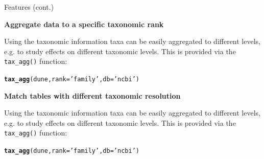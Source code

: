 \documentclass[final,t]{beamer}\usepackage[]{graphicx}\usepackage[]{color}
\makeatletter
\newcommand{\hlstr}[1]{\textcolor[rgb]{0.192,0.494,0.8}{#1}}%
\newcommand{\hlstd}[1]{\textcolor[rgb]{0.345,0.345,0.345}{#1}}%
\newcommand{\hlkwc}[1]{\textcolor[rgb]{0.333,0.667,0.333}{#1}}%
\newcommand{\hlkwd}[1]{\textcolor[rgb]{0.737,0.353,0.396}{\textbf{#1}}}%
\newenvironment{kframe}{%
 \def\at@end@of@kframe{}%
 \ifinner\ifhmode%
  \def\at@end@of@kframe{\end{minipage}}%
  \begin{minipage}{\columnwidth}%
 \fi\fi%
 \def\FrameCommand##1{\hskip\@totalleftmargin \hskip-\fboxsep
 \colorbox{shadecolor}{##1}\hskip-\fboxsep
     \hskip-\linewidth \hskip-\@totalleftmargin \hskip\columnwidth}%
 \MakeFramed {\advance\hsize-\width
   \@totalleftmargin\z@ \linewidth\hsize
   \@setminipage}}%
 {\par\unskip\endMakeFramed%
 \at@end@of@kframe}
\newenvironment{knitrout}{}{} %
\renewenvironment{knitrout}{}{\vspace{-1.8em}}
\makeatother
\begin{document}
\begin{frame}[fragile]
\begin{columns}[t]
\begin{column}{.49\linewidth}
\begin{block}{Features (cont.)}
\begin{knitrout}
\end{knitrout}
\vspace{2em}

\textcolor{i6bluedark}{\textbf{\large Aggregate data to a specific taxonomic rank}}
        \vspace{0.5em}
        \par
        \begingroup
        \leftskip=2cm
        \noindent 
          Using the taxonomic information taxa can be easily aggregated to different levels, e.g. to study effects on different taxonomic levels.
          This is provided via the \texttt{tax\_agg()} function:
        \par
        \endgroup

\begin{knitrout}\footnotesize
{}\color{fgcolor}\begin{kframe}
\begin{alltt}
\hlkwd{tax_agg}\hlstd{(dune,} \hlkwc{rank} \hlstd{=} \hlstr{'family'}\hlstd{,} \hlkwc{db} \hlstd{=} \hlstr{'ncbi'}\hlstd{)}
\end{alltt}
\end{kframe}
\end{knitrout}
\vspace{2em}

\textcolor{i6bluedark}{\textbf{\large Match tables with different taxonomic resolution}}
        \vspace{0.5em}
        \par
        \begingroup
        \leftskip=2cm
        \noindent 
          Using the taxonomic information taxa can be easily aggregated to different levels, e.g. to study effects on different taxonomic levels.
          This is provided via the \texttt{tax\_agg()} function:
        \par
        \endgroup

\begin{knitrout}\footnotesize
{}\color{fgcolor}\begin{kframe}
\begin{alltt}
\hlkwd{tax_agg}\hlstd{(dune,} \hlkwc{rank} \hlstd{=} \hlstr{'family'}\hlstd{,} \hlkwc{db} \hlstd{=} \hlstr{'ncbi'}\hlstd{)}
\end{alltt}
\end{kframe}
\end{knitrout}
\vspace{2em}
      \end{block}
      

\end{column}
\end{columns}
\end{frame}
\end{document}
